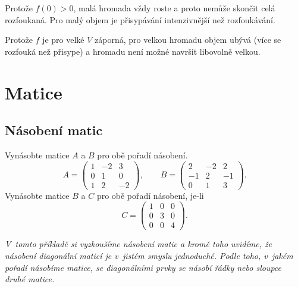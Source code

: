 Protože $f(0)>0$, malá hromada vždy roste a proto nemůže skončit celá rozfoukaná. Pro malý objem je přisypávání intenzivnější než rozfoukávání.

Protože $f$ je pro velké $V$ záporná, pro velkou hromadu objem ubývá (více se rozfouká než přisype) a hromadu není možné navršit libovolně velkou. 

\konec



\stranka



\stranka
\section{Matice}

\subsection{Násobení matic}
Vynásobte matice $A$ a $B$ pro obě pořadí násobení.
\begin{equation*}
A=  \begin{pmatrix}
  1 & -2 & 3\\
  0 & 1 & 0\\
  1 & 2 & -2
\end{pmatrix},\qquad
B=  \begin{pmatrix}
  2 & -2 & 2\\
  -1 & 2 & -1\\
  0 & 1 & 3
\end{pmatrix}.
\end{equation*}
Vynásobte matice $B$ a $C$ pro obě pořadí násobení, je-li 
\begin{equation*}
C=  \begin{pmatrix}
  1 & 0 & 0\\
  0 & 3 & 0\\
  0 & 0 & 4
\end{pmatrix}.
\end{equation*}

\textit{V tomto příkladě si vyzkoušíme násobení matic a kromě toho uvidíme, že násobení diagonální maticí je v jistém smyslu jednoduché. Podle toho, v jakém pořadí násobíme matice, se diagonálními prvky se násobí řádky nebo sloupce druhé matice.}


